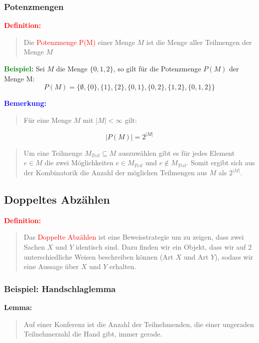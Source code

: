\documentclass{article}
\newcommand{\red}[1]{\textcolor{red}{#1}}
\newcommand{\blue}[1]{\textcolor{blue}{#1}}
\newcommand{\green}[1]{\textcolor{green}{#1}}
\newcommand{\dgr}[1]{\textcolor{dgr}{#1}}
\newcommand{\ex}{\green{\textbf{Beispiel: }}}
\newcommand{\de}[1]{\red{\textbf{Definition: }}\begin{quote}#1\end{quote}}
\newcommand{\an}[1]{\blue{\textbf{Bemerkung: }}\begin{quote}#1\end{quote}}
\newcommand{\lem}[1]{\dgr{\textbf{Lemma: }}\begin{quote}#1\end{quote}}
\begin{document}
\subsubsection{Potenzmengen}

\de{Die \red{Potenzmenge P(M)} einer Menge $M$ ist die Menge aller Teilmengen der Menge $M$}

\ex Sei $M$ die Menge $\{0, 1, 2\}$, so gilt für die Potenzmenge $P(M)$ der Menge M:
\begin{equation*}
    P(M) = \{\emptyset, \{0\}, \{1\}, \{2\}, \{0, 1\}, \{0, 2\}, \{1, 2\}, \{0, 1, 2\}\}
\end{equation*}

\an{Für eine Menge $M$ mit $|M| < \infty$ gilt:}
\begin{equation*}
    |P(M)| = 2^{|M|}
\end{equation*}
\begin{quote}
    Um eine Teilmenge $M_{Teil} \subseteq M$ auszuwählen gibt es für jedes Element $e \in M$ die zwei Möglichkeiten $e \in M_{Teil}$ und $e \notin M_{Teil}$.
    Somit ergibt sich aus der Kombinatorik die Anzahl der möglichen Teilmengen aus $M$ als $2^{|M|}$.
\end{quote}

\subsection{Doppeltes Abzählen}

\de{Das \red{Doppelte Abzählen} ist eine Beweisstrategie um zu zeigen, dass zwei Sachen $X$ und $Y$ identisch sind. Dazu finden wir ein Objekt, dass wir auf $2$ unterschiedliche Weisen beschreiben können (Art $X$ und Art $Y$), sodass wir eine Aussage über $X$ und $Y$ erhalten.}

\subsubsection{Beispiel: Handschlaglemma}
\lem{
    Auf einer Konferenz ist die Anzahl der Teilnehmenden, die einer ungeraden Teilnehmerzahl die Hand gibt, immer gerade.
} 
\end{document}
